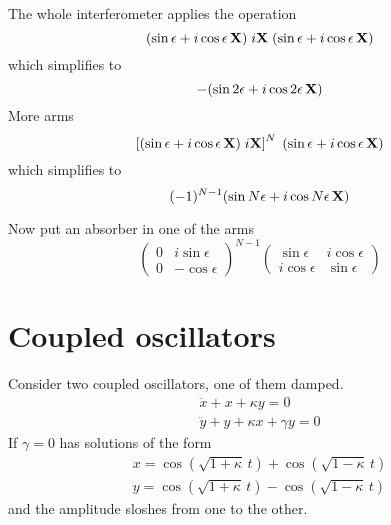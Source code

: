 \documentclass[12pt,aps,prb,preprint]{revtex4}
\def\X{{\bf X}}
\begin{document}
The whole interferometer applies the operation
\begin{equation}
     (\sin\epsilon + i\cos\epsilon\,\X)
     \; i\X \;
     (\sin\epsilon + i\cos\epsilon\,\X)
\end{equation}
which simplifies to
\begin{equation}
     -(\sin2\epsilon + i\cos2\epsilon\,\X)
\end{equation}
More arms
\begin{equation}
     \left[ (\sin\epsilon + i\cos\epsilon\,\X) \; i\X \right]^N \;
     (\sin\epsilon + i\cos\epsilon\,\X)
\end{equation}
which simplifies to
\begin{equation}
     (-1)^{N-1} (\sin N\epsilon + i\cos N\epsilon\,\X)
\end{equation}

Now put an absorber in one of the arms
\begin{equation}
\left( \begin{array}{cc} 0 & i\sin\epsilon \\
                         0 & -\cos\epsilon \end{array} \right)^{N-1}
\left( \begin{array}{cc} \sin\epsilon & i\cos\epsilon \\
                        i\cos\epsilon & \sin\epsilon \end{array} \right)
\end{equation}


\section{Coupled oscillators}

Consider two coupled oscillators, one of them damped.
\begin{equation}
\begin{array}{l}
\ddot x + x + \kappa y = 0 \\
\ddot y + y + \kappa x + \gamma y = 0
\end{array}
\end{equation}
If $\gamma=0$ has solutions of the form
\begin{equation}
\begin{array}{l}
x = \cos(\sqrt{1+\kappa}\,t) + \cos(\sqrt{1-\kappa}\,t)  \\
y = \cos(\sqrt{1+\kappa}\,t) - \cos(\sqrt{1-\kappa}\,t)
\end{array}
\end{equation}
and the amplitude sloshes from one to the other.
\end{document}
